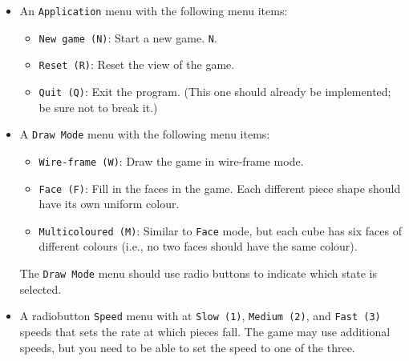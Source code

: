 \begin{itemize}
	\item An \texttt{Application} menu with the following menu items:
	\begin{itemize}
		\item \texttt{New game (N)}: Start a new game.
			\texttt{N}.
		\item \texttt{Reset (R)}: Reset the view of the game.
		\item \texttt{Quit (Q)}: Exit the program.  
			(This one should already
			be implemented; be sure not to break it.)
	\end{itemize}

	\item A \texttt{Draw Mode} menu with the following menu items:
	\begin{itemize}
		\item \texttt{Wire-frame (W)}: Draw the game in wire-frame mode.
		\item \texttt{Face (F)}: Fill in the faces in the game.  Each
			different piece shape should have its own uniform colour.
		\item \texttt{Multicoloured (M)}: Similar to \texttt{Face} mode,
			but each cube has six faces of different colours
                        (i.e., no two faces should have the same colour).
	\end{itemize}

	The \texttt{Draw Mode} menu should use radio buttons to
	indicate which state is selected.

	\item A radiobutton \texttt{Speed} menu with at \texttt{Slow (1)}, 
          \texttt{Medium (2)}, and \texttt{Fast (3)} 
          speeds that sets the rate at which pieces fall.  
		The game may use additional speeds, but you need
		to be able to set the speed to one of the three.

\iffalse
	\item A \texttt{Buffering (B)} menu with the following menu item:
	\begin{itemize}
		\item \texttt{Double buffer}: Toggle double-buffering. This should be a check item.
	\end{itemize}

	The keyboard shortcut \texttt{B} should toggle the buffering mode.
\fi


\end{itemize}
